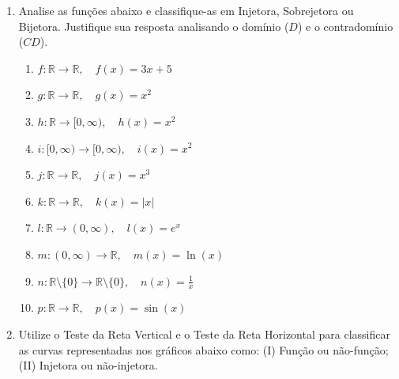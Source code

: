 \documentclass[12pt]{article}
\begin{document}
\begin{enumerate}[label=\arabic*), leftmargin=1.5cm, itemsep=1cm]
    \item Analise as funções abaixo e classifique-as em Injetora, Sobrejetora ou Bijetora. Justifique sua resposta analisando o domínio ($D$) e o contradomínio ($CD$).
    \begin{enumerate}[label=\alph*)]
        \item $f: \mathbb{R} \to \mathbb{R}, \quad f(x) = 3x + 5$
        \item $g: \mathbb{R} \to \mathbb{R}, \quad g(x) = x^2$
        \item $h: \mathbb{R} \to [0, \infty), \quad h(x) = x^2$
        \item $i: [0, \infty) \to [0, \infty), \quad i(x) = x^2$
        \item $j: \mathbb{R} \to \mathbb{R}, \quad j(x) = x^3$
        \item $k: \mathbb{R} \to \mathbb{R}, \quad k(x) = |x|$
        \item $l: \mathbb{R} \to (0, \infty), \quad l(x) = e^x$
        \item $m: (0, \infty) \to \mathbb{R}, \quad m(x) = \ln(x)$
        \item $n: \mathbb{R} \setminus \{0\} \to \mathbb{R} \setminus \{0\}, \quad n(x) = \frac{1}{x}$
        \item $p: \mathbb{R} \to \mathbb{R}, \quad p(x) = \sin(x)$
    \end{enumerate}


    \item Utilize o Teste da Reta Vertical e o Teste da Reta Horizontal para classificar as curvas representadas nos gráficos abaixo como: (I) Função ou não-função; (II) Injetora ou não-injetora.

    \begin{center}
\end{center}
\end{enumerate}
\end{document}
